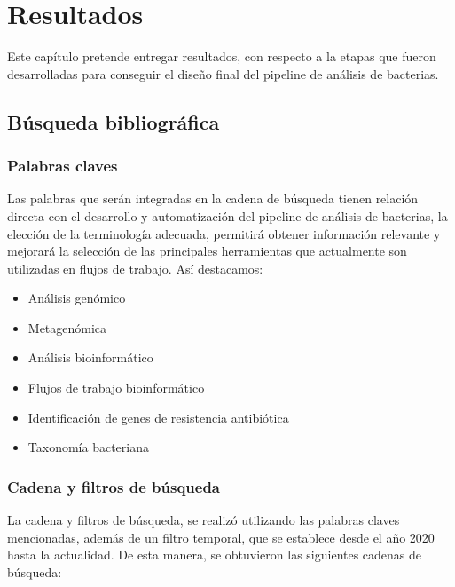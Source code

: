 \documentclass[12pt]{article}
\begin{document}
\newpage
\section{Resultados}
Este capítulo pretende entregar resultados, con respecto a 
la etapas que fueron desarrolladas para conseguir el diseño 
final del pipeline de análisis de bacterias.

\subsection{Búsqueda bibliográfica}
\subsubsection*{Palabras claves}

Las palabras que serán integradas en la cadena de búsqueda 
tienen relación directa con el desarrollo y automatización del 
pipeline de análisis de bacterias,  la  elección de la 
terminología adecuada, permitirá obtener información relevante y 
mejorará la selección de las principales herramientas que 
actualmente son utilizadas en flujos de trabajo. Así destacamos:

\begin{itemize}
    \item Análisis genómico
    \item Metagenómica
    \item Análisis bioinformático
    \item Flujos de trabajo bioinformático
    \item Identificación de genes de resistencia antibiótica
    \item Taxonomía bacteriana
\end{itemize}

\subsubsection*{Cadena y filtros de búsqueda}

La cadena y filtros de búsqueda, se realizó utilizando 
las palabras claves mencionadas, además de  un filtro 
temporal, que se establece desde el año 2020 hasta la
actualidad. De esta manera, se obtuvieron las siguientes 
cadenas de búsqueda:
\end{document}
